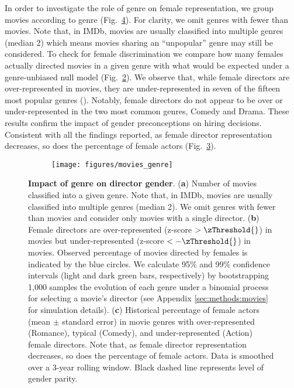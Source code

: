 In order to investigate the role of genre on female representation, we group movies according to genre (Fig.~\ref{fig:movies:genre}). For clarity, we omit genres with fewer than \popularThreshold{} movies. Note that, in IMDb, movies are usually classified into multiple genres (median 2) which means movies sharing an ``unpopular'' genre may still be considered. To check for female discrimination we compare how many females actually directed movies in a given genre with what would be expected under a genre-unbiased null model (Fig.~\ref{fig:movies:genre_b}). We observe that, while female directors are over-represented in \overGenres{} movies, they are under-represented in seven of the fifteen most popular genres (\underGenres{}). Notably, female directors do not appear to be over or under-represented in the two most common genres, Comedy and Drama. These results confirm the impact of gender preconceptions on hiring decisions. Consistent with all the findings reported, as female director representation decreases, so does the percentage of female actors (Fig.~\ref{fig:movies:genre_c}).


\begin{figure}[t]
    \begin{subfigure}{0.8\textwidth}
        \texttt{[image: figures/movies\_genre]}
        \label{fig:movies:genre_a}
    \end{subfigure}
    \begin{subfigure}{0\textwidth}
        \label{fig:movies:genre_b}
    \end{subfigure}
    \begin{subfigure}{0\textwidth}
        \label{fig:movies:genre_c}
    \end{subfigure}
\caption[Impact of genre on director gender.]{\textbf{Impact of genre on director gender}. (\textbf{a}) Number of movies classified into a given genre. Note that, in IMDb, movies are usually classified into multiple genres (median 2). We omit genres with fewer than \popularThreshold{} movies and consider only movies with a single director. (\textbf{b}) Female directors are over-represented (z-score $ > \zThreshold{}$) in \overGenres{} movies but under-represented (z-score $ < -\zThreshold{}$) in \underGenres{} movies. Observed percentage of movies directed by females is indicated by the blue circles. We calculate 95\% and 99\% confidence intervals (light and dark green bars, respectively) by bootstrapping 1,000 samples the evolution of each genre under a binomial process for selecting a movie's director (see Appendix \ref{sec:methods:movies} for simulation details). (\textbf{c}) Historical percentage of female actors (mean $\pm$ standard error) in movie genres with over-represented (Romance), typical (Comedy), and under-represented (Action) female directors. Note that, as female director representation decreases, so does the percentage of female actors. Data is smoothed over a 3-year rolling window. Black dashed line represents level of gender parity.}
\label{fig:movies:genre}
\end{figure}



